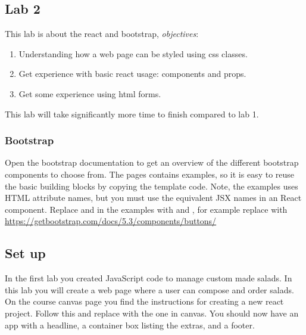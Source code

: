 \documentclass[fleqn, article, a4paper]{memoir}
\begin{document}
\maketitle
\thispagestyle{titlepage}
\vspace{-4cm}

\subsection*{Lab 2}

\n This lab is about the react and bootstrap, \emph{objectives}:

\begin{enumerate}\firmlist
\item Understanding how a web page can be styled using css classes.
\item Get experience with basic react usage: components and props.
\item Get some experience using html forms.
\end{enumerate}
\noindent This lab will take significantly more time to finish compared to lab 1.
\subsubsection*{Bootstrap}
Open the bootstrap documentation to get an overview of the different bootstrap components to choose from. The pages contains examples, so it is easy to reuse the basic building blocks by copying the template code. Note, the examples uses HTML attribute names, but you must use the equivalent JSX names in an React component. Replace  and  in the examples with  and , for example replace  with 
\\ \url{https://getbootstrap.com/docs/5.3/components/buttons/}

\subsection*{Set up}

In the first lab you created JavaScript code to manage custom made salads. In this lab you will create a web page where a user can compose and order salads. On the course canvas page you find the instructions for creating a new react project. Follow this and replace  with the one in canvas. You should now have an app with a headline, a container box listing the extras, and a footer.
\end{document}
